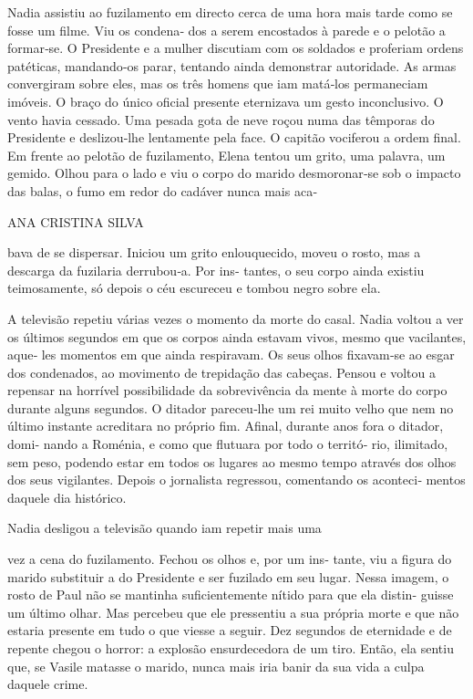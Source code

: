Nadia assistiu ao fuzilamento em directo cerca de uma hora mais tarde
como se fosse um filme. Viu os condena‑ dos a serem encostados à parede
e o pelotão a formar‑se. O Presidente e a mulher discutiam com os
soldados e proferiam ordens patéticas, mandando‑os parar, tentando ainda
demonstrar autoridade. As armas convergiram sobre eles, mas os três
homens que iam matá‑los permaneciam imóveis. O braço do único oficial
presente eternizava um gesto inconclusivo. O vento havia cessado. Uma
pesada gota de neve roçou numa das têmporas do Presidente e deslizou‑lhe
lentamente pela face. O capitão vociferou a ordem final. Em frente ao
pelotão de fuzilamento, Elena tentou um grito, uma palavra, um gemido.
Olhou para o lado e viu o corpo do marido desmoronar‑se sob o impacto
das balas, o fumo em redor do cadáver nunca mais aca‑

ANA CRISTINA SILVA

bava de se dispersar. Iniciou um grito enlouquecido, moveu o rosto, mas
a descarga da fuzilaria derrubou‑a. Por ins‑ tantes, o seu corpo ainda
existiu teimosamente, só depois o céu escureceu e tombou negro sobre
ela.

A televisão repetiu várias vezes o momento da morte do casal. Nadia
voltou a ver os últimos segundos em que os corpos ainda estavam vivos,
mesmo que vacilantes, aque‑ les momentos em que ainda respiravam. Os
seus olhos fixavam‑se ao esgar dos condenados, ao movimento de
trepidação das cabeças. Pensou e voltou a repensar na horrível
possibilidade da sobrevivência da mente à morte do corpo durante alguns
segundos. O ditador pareceu‑lhe um rei muito velho que nem no último
instante acreditara no próprio fim. Afinal, durante anos fora o ditador,
domi‑ nando a Roménia, e como que flutuara por todo o territó‑ rio,
ilimitado, sem peso, podendo estar em todos os lugares ao mesmo tempo
através dos olhos dos seus vigilantes. Depois o jornalista regressou,
comentando os aconteci‑ mentos daquele dia histórico.

Nadia desligou a televisão quando iam repetir mais uma

vez a cena do fuzilamento. Fechou os olhos e, por um ins‑ tante, viu a
figura do marido substituir a do Presidente e ser fuzilado em seu lugar.
Nessa imagem, o rosto de Paul não se mantinha suficientemente nítido
para que ela distin‑ guisse um último olhar. Mas percebeu que ele
pressentiu a sua própria morte e que não estaria presente em tudo o que
viesse a seguir. Dez segundos de eternidade e de repente chegou o
horror: a explosão ensurdecedora de um tiro. Então, ela sentiu que, se
Vasile matasse o marido, nunca mais iria banir da sua vida a culpa
daquele crime.

